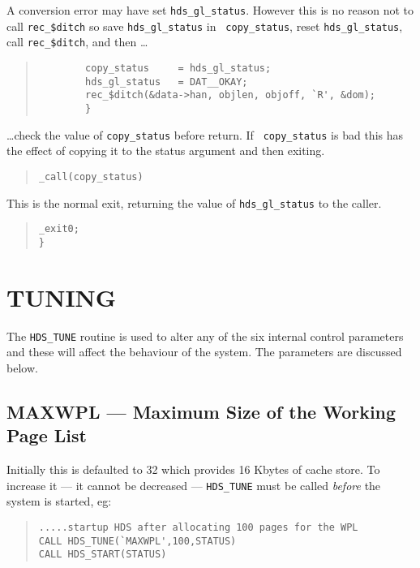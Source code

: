 A conversion error may have set {\tt hds\_gl\_status}. However this is no
reason not to call {\tt rec\_\$ditch} so save {\tt hds\_gl\_status} in {\tt
copy\_status}, reset {\tt hds\_gl\_status}, call {\tt rec\_\$ditch}, and then
\ldots

\begin {quote}
\begin {verbatim}
        copy_status     = hds_gl_status;
        hds_gl_status   = DAT__OKAY;
        rec_$ditch(&data->han, objlen, objoff, `R', &dom);
        }
\end{verbatim}
\end {quote}
\ldots check the value of {\tt copy\_status} before return. If {\tt
copy\_status} is bad this has the effect of copying it to the status argument
and then exiting.

\begin {quote}
\begin {verbatim}
_call(copy_status)
\end{verbatim}
\end {quote}

This is the normal exit, returning the value of {\tt hds\_gl\_status} to the
caller.

\begin {quote}
\begin {verbatim}
_exit0;
}
\end{verbatim}
\end {quote}

\section {TUNING}
\label {system_tuning}

The {\tt HDS\_TUNE} routine is used to alter any of the six internal control
parameters and these will affect the behaviour of the system. The parameters
are discussed below.

\subsection {MAXWPL --- Maximum Size of the Working Page List}

Initially this is defaulted to 32 which provides 16 Kbytes of cache store. To
increase it --- it cannot be decreased --- {\tt HDS\_TUNE} must be called {\em
before} the system is started, eg:

\begin {quote}
\begin {verbatim}
.....startup HDS after allocating 100 pages for the WPL
CALL HDS_TUNE(`MAXWPL',100,STATUS)
CALL HDS_START(STATUS)
\end{verbatim}
\end {quote}

